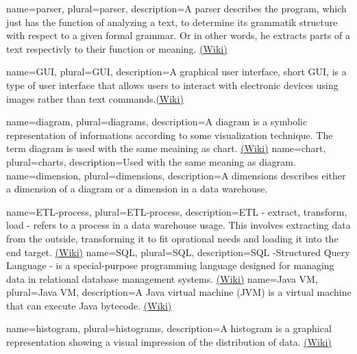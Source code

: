 {
  name=parser,
  plural=parser,
  description={A parser describes the program, which just has the function of analyzing a text, 
  to determine its grammatik structure with respect to a given formal grammar. Or in other words,
  he extracts parts of a text respectivly to their function or meaning. 
  \href{https://en.wikipedia.org/wiki/Parser}{(Wiki)} }
}

{
  name=GUI,
  plural=GUI,
  description={A graphical user interface, short GUI, is a type of user interface 
  that allows users to interact with electronic devices using images rather 
  than text commands.\href{https://en.wikipedia.org/wiki/Graphical_user_interface}{(Wiki)}}
}

{
  name=diagram,
  plural=diagrams,
  description={A diagram is a symbolic representation of informations according to some
  visualization technique. The term diagram is used with the same meaining as \gls{chart}.
  \href{https://en.wikipedia.org/wiki/Diagram}{(Wiki)}}
}
{
  name=chart,
  plural=charts,
  description={Used with the same meaning as \gls{diagram}.}
}
{
  name=dimension,
  plural=dimensions,
  description={A dimensions describes either a dimension of a \gls{diagram} or a dimension in a
  \gls{data warehouse}.  }
}

{
  name=ETL-process,
  plural=ETL-process,
  description={ETL - extract, transform, load - refers to a process in a \gls{data warehouse} usage. This involves
  extracting data from the outside, transforming it to fit oprational needs and loading it into the end target.
 \href{https://de.wikipedia.org/wiki/ETL-Prozess}{(Wiki)}}
}
{
  name=SQL,
  plural=SQL,
  description={SQL -Structured Query Language - is a special-purpose programming language designed for 
  managing data in relational \gls{database} management systems. \href{https://en.wikipedia.org/wiki/Sql}{(Wiki)}}
}
{
  name=Java VM,
  plural=Java VM,
  description={A Java virtual machine (JVM) is a virtual machine that can execute Java bytecode. 
  \href{https://en.wikipedia.org/wiki/Java_virtual_machine}{(Wiki)}}
}

{
  name=histogram,
  plural=histograms,
  description={A histogram is a graphical representation showing a visual impression of the distribution of data. 
   \href{http://en.wikipedia.org/wiki/Histogram}{(Wiki)}}
}

